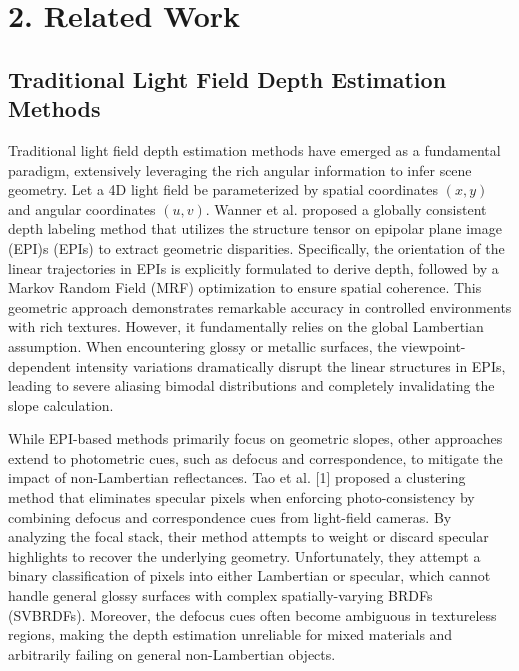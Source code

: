 \section{2. Related Work}

\subsection{Traditional Light Field Depth Estimation Methods}

Traditional light field depth estimation methods have emerged as a fundamental paradigm, extensively leveraging the rich angular information to infer scene geometry. Let a 4D light field be parameterized by spatial coordinates $(x, y)$ and angular coordinates $(u, v)$. Wanner et al.  proposed a globally consistent depth labeling method that utilizes the structure tensor on epipolar plane image (EPI)s (EPIs) to extract geometric disparities. Specifically, the orientation of the linear trajectories in EPIs is explicitly formulated to derive depth, followed by a Markov Random Field (MRF) optimization to ensure spatial coherence. This geometric approach demonstrates remarkable accuracy in controlled environments with rich textures. However, it fundamentally relies on the global Lambertian assumption. When encountering glossy or metallic surfaces, the viewpoint-dependent intensity variations dramatically disrupt the linear structures in EPIs, leading to severe aliasing bimodal distributions and completely invalidating the slope calculation.

While EPI-based methods primarily focus on geometric slopes, other approaches extend to photometric cues, such as defocus and correspondence, to mitigate the impact of non-Lambertian reflectances. Tao et al. [1] proposed a clustering method that eliminates specular pixels when enforcing photo-consistency by combining defocus and correspondence cues from light-field cameras. By analyzing the focal stack, their method attempts to weight or discard specular highlights to recover the underlying geometry. Unfortunately, they attempt a binary classification of pixels into either Lambertian or specular, which cannot handle general glossy surfaces with complex spatially-varying BRDFs (SVBRDFs). Moreover, the defocus cues often become ambiguous in textureless regions, making the depth estimation unreliable for mixed materials and arbitrarily failing on general non-Lambertian objects.

